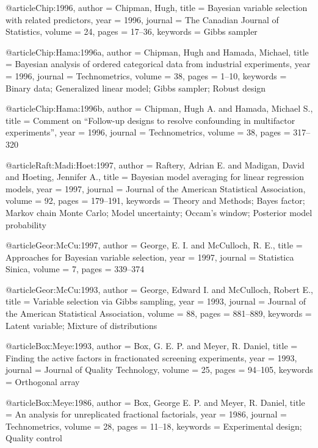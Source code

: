 @article{Chip:1996,
    author = {Chipman, Hugh},
    title = {Bayesian variable selection with related predictors},
    year = {1996},
    journal = {The Canadian Journal of Statistics},
    volume = {24},
    pages = {17--36},
    keywords = {Gibbs sampler}
}

@article{Chip:Hama:1996a,
    author = {Chipman, Hugh and Hamada, Michael},
    title = {Bayesian analysis of ordered categorical data from industrial experiments},
    year = {1996},
    journal = {Technometrics},
    volume = {38},
    pages = {1--10},
    keywords = {Binary data; Generalized linear model; Gibbs sampler; Robust design}
}

@article{Chip:Hama:1996b,
    author = {Chipman, Hugh A. and Hamada, Michael S.},
    title = {Comment on ``{F}ollow-up designs to resolve confounding in multifactor experiments''},
    year = {1996},
    journal = {Technometrics},
    volume = {38},
    pages = {317--320}
}


@article{Raft:Madi:Hoet:1997,
    author = {Raftery, Adrian E. and Madigan, David and Hoeting, Jennifer A.},
    title = {Bayesian model averaging for linear regression models},
    year = {1997},
    journal = {Journal of the American Statistical Association},
    volume = {92},
    pages = {179--191},
    keywords = {Theory and Methods; Bayes factor; Markov chain Monte
Carlo; Model uncertainty; Occam's window; Posterior model probability}
}

@article{Geor:McCu:1997,
    author = {George, E. I. and McCulloch, R. E.},
    title = {Approaches for {B}ayesian variable selection},
    year = {1997},
    journal = {Statistica Sinica},
    volume = {7},
    pages = {339--374}
}

@article{Geor:McCu:1993,
    author = {George, Edward I. and McCulloch, Robert E.},
    title = {Variable selection via {G}ibbs sampling},
    year = {1993},
    journal = {Journal of the American Statistical Association},
    volume = {88},
    pages = {881--889},
    keywords = {Latent variable; Mixture of distributions}
}

@article{Box:Meye:1993,
    author = {Box, G. E. P. and Meyer, R. Daniel},
    title = {Finding the active factors in fractionated screening experiments},
    year = {1993},
    journal = {Journal of Quality Technology},
    volume = {25},
    pages = {94--105},
    keywords = {Orthogonal array}
}

@article{Box:Meye:1986,
    author = {Box, George E. P. and Meyer, R. Daniel},
    title = {An analysis for unreplicated fractional factorials},
    year = {1986},
    journal = {Technometrics},
    volume = {28},
    pages = {11--18},
    keywords = {Experimental design; Quality control}
}

